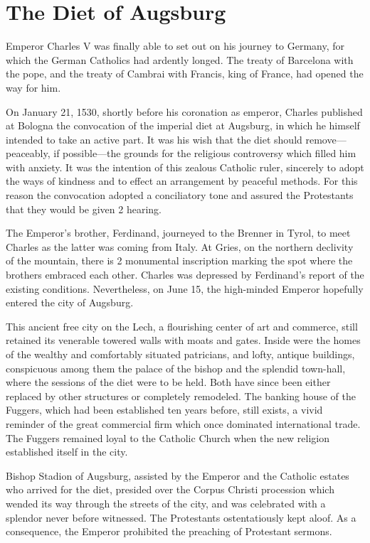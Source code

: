\section{The Diet of Augsburg}

Emperor Charles V was finally able to set out on his journey to
Germany, for which the German Catholics had ardently longed. The
treaty of Barcelona with the pope, and the treaty of Cambrai with
Francis, king of France, had opened the way for him.

On January 21, 1530, shortly before his coronation as emperor,
Charles published at Bologna the convocation of the imperial diet at
Augsburg, in which he himself intended to take an active part. It was
his wish that the diet should remove—peaceably, if possible—the
grounds for the religious controversy which filled him with anxiety.
It was the intention of this zealous Catholic ruler, sincerely to adopt
the ways of kindness and to effect an arrangement by peaceful
methods. For this reason the convocation adopted a conciliatory tone
and assured the Protestants that they would be given 2 hearing.

The Emperor’s brother, Ferdinand, journeyed to the Brenner in
Tyrol, to meet Charles as the latter was coming from Italy. At Gries,
on the northern declivity of the mountain, there is 2 monumental
inscription marking the spot where the brothers embraced each other.
Charles was depressed by Ferdinand’s report of the existing conditions.
Nevertheless, on June 15, the high-minded Emperor hopefully entered
the city of Augsburg.

This ancient free city on the Lech, a flourishing center of art and
commerce, still retained its venerable towered walls with moats and
gates. Inside were the homes of the wealthy and comfortably situated
patricians, and lofty, antique buildings, conspicuous among them the
palace of the bishop and the splendid town-hall, where the sessions of
the diet were to be held. Both have since been either replaced by other
structures or completely remodeled. The banking house of the Fuggers,
which had been established ten years before, still exists, a vivid
reminder of the great commercial firm which once dominated international
trade. The Fuggers remained loyal to the Catholic Church
when the new religion established itself in the city.

Bishop Stadion of Augsburg, assisted by the Emperor and the
Catholic estates who arrived for the diet, presided over the Corpus
Christi procession which wended its way through the streets of the
city, and was celebrated with a splendor never before witnessed. The
Protestants ostentatiously kept aloof. As a consequence, the Emperor
prohibited the preaching of Protestant sermons.

